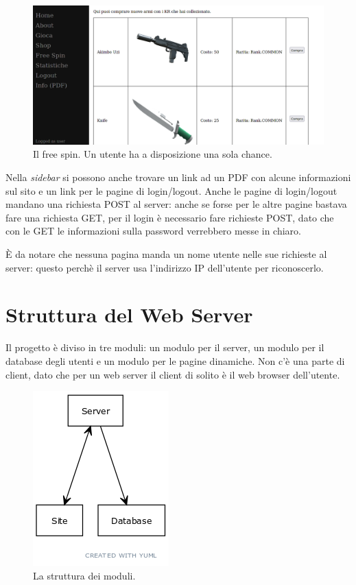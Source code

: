 \documentclass[a4paper,12pt]{report}
\begin{document}
\begin{figure}[h]
\centering{}
\includegraphics[width=\textwidth]{shop.png}
\caption{Il free spin. Un utente ha a disposizione una sola chance.}
\label{img:home_user}
\end{figure}

Nella \textit{sidebar} si possono anche trovare un link ad un PDF con alcune informazioni sul sito e un link per le pagine di login/logout. Anche le pagine di login/logout mandano una richiesta POST al server: anche se forse per le altre pagine bastava fare una richiesta GET, per il login è necessario fare richieste POST, dato che con le GET le informazioni sulla password verrebbero messe in chiaro.

È da notare che nessuna pagina manda un nome utente nelle sue richieste al server: questo perchè il server usa l'indirizzo IP dell'utente per riconoscerlo.

\chapter{Struttura del Web Server}

Il progetto è diviso in tre moduli: un modulo per il server, un modulo per il database degli utenti e un modulo per le pagine dinamiche. Non c'è una parte di client, dato che per un web server il client di solito è il web browser dell'utente.

\begin{figure}[h]
\centering{}
\includegraphics[]{uml1.png}
\caption{La struttura dei moduli.}
\label{img:uml_modules}
\end{figure}
\end{document}
